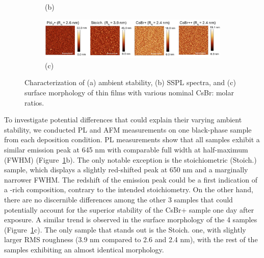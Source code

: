 \begin{figure}[htbp]
\begin{subfigure}[t]{0.45\textwidth}
        \caption*{(b)}
    \end{subfigure}

    \begin{subfigure}[t]{0.99\textwidth}
        \centering
        \includegraphics[width=\textwidth]{chapters/stability/imeges/Stability_Rotation_Stoich_AFM.pdf} %
        \caption*{(c)}
    \end{subfigure}

    \caption{Characterization of (a) ambient stability, (b) SSPL spectra, and (c) surface morphology of  thin films with various nominal CsBr: molar ratios.}
    \label{fig:stability:stoichiomtries_rotation}
\end{figure}

To investigate potential differences that could explain their varying ambient stability, we conducted PL and AFM measurements on one black-phase sample from each deposition condition. PL measurements show that all samples exhibit a similar emission peak at 645 nm with comparable full width at half-maximum (FWHM) (Figure~\ref{fig:stability:stoichiomtries_rotation}b). The only notable exception is the stoichiometric (Stoich.) sample, which displays a slightly red-shifted peak at 650 nm and a marginally narrower FWHM. The redshift of the emission peak could be a first indication of a -rich composition, contrary to the intended stoichiometry. On the other hand, there are no discernible differences among the other 3 samples that could potentially account for the superior stability of the CsBr+ sample one day after exposure. A similar trend is observed in the surface morphology of the 4 samples (Figure~\ref{fig:stability:stoichiomtries_rotation}c). The only sample that stands out is the Stoich. one, with slightly larger RMS roughness (3.9 nm compared to 2.6 and 2.4 nm), with the rest of the samples exhibiting an almost identical morphology. 


